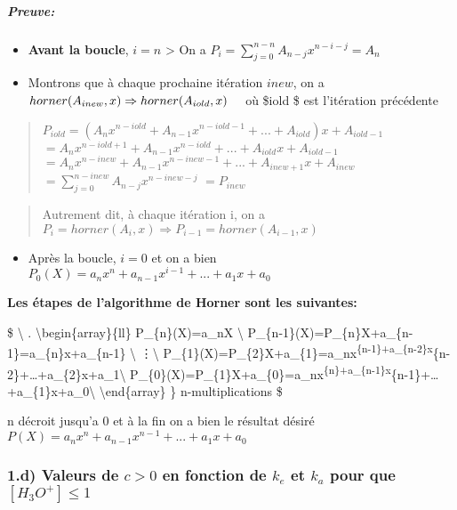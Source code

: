 \documentclass[11pt]{article}
\providecommand{\tightlist}{%
      \setlength{\itemsep}{0pt}\setlength{\parskip}{0pt}}
\begin{document}
\hypertarget{preuve}{%
\subparagraph{\texorpdfstring{\textbf{Preuve}:}{Preuve:}}\label{preuve}}

\begin{itemize}
\tightlist
\item
  \textbf{Avant la boucle}, \(i = n\) \textgreater{} On a
  \(P_i = \sum_{j=0}^{n-n}A_{n-j}x^{n-i-j}=A_n\)
\item
  Montrons que à chaque prochaine itération \(inew\), on a
  \(horner(A_{inew},x)\Rightarrow horner(A_{iold},x)\hspace{10px}\) où
  \$\hspace{10px}iold \$ est l'itération précédente
\end{itemize}

\begin{quote}
\(P_{iold}= (A_nx^{n-iold}+A_{n-1}x^{n-iold-1}+...+A_{iold})x+A_{iold-1}\)
\(= A_nx^{n-iold+1}+A_{n-1}x^{n-iold}+...+A_{iold}x+A_{iold-1}\)
\(= A_nx^{n-inew}+A_{n-1}x^{n-inew-1}+...+A_{inew+1}x+A_{inew}\)
\(=\sum_{j=0}^{n-inew}A_{n-j}x^{n-inew-j}\) \(=P_{inew}\)
\end{quote}

\begin{quote}
Autrement dit, à chaque itération i, on a
\(P_i = horner(A_i,x) \Rightarrow P_{i-1} = horner(A_{i-1},x)\)
\end{quote}

\begin{itemize}
\tightlist
\item
  Après la boucle, \(i=0\) et on a bien
  \(P_{0}(X)=a_nx^{n}+a_{n-1}x^{i-1}+...+a_{1}x+a_0\)
\end{itemize}

    \textbf{Les étapes de l'algorithme de Horner sont les suivantes:}

\$ \textbackslash{} \left. \textbackslash{}begin\{array\}\{ll\}
P\_\{n\}(X)=a\_nX \textbackslash{}
P\_\{n-1\}(X)=P\_\{n\}X+a\_\{n-1\}=a\_\{n\}x+a\_\{n-1\} \textbackslash{}
\vdots \textbackslash{}
P\_\{1\}(X)=P\_\{2\}X+a\_\{1\}=a\_nx\textsuperscript{\{n-1\}+a\_\{n-2\}x}\{n-2\}+\ldots{}+a\_\{2\}x+a\_1\textbackslash{}
P\_\{0\}(X)=P\_\{1\}X+a\_\{0\}=a\_nx\textsuperscript{\{n\}+a\_\{n-1\}x}\{n-1\}+\ldots{}+a\_\{1\}x+a\_0\textbackslash{}
\textbackslash{}end\{array\} \right \} n-multiplications \$

n décroit jusqu'a 0 et à la fin on a bien le résultat désiré
\(P(X)= a_nx^{n}+a_{n-1}x^{n-1}+...+a_{1}x+a_0\) 

    \hypertarget{d-valeurs-de-c0-en-fonction-de-k_e-et-k_a-pour-que-h_3oleqslant-1}{%
\subsubsection{\texorpdfstring{\textbf{1.d) Valeurs de \(c>0\) en
fonction de \(k_e\) et \(k_a\) pour que
\([H_3O^+]\leqslant 1\)}}{1.d) Valeurs de c\textgreater{}0 en fonction de k\_e et k\_a pour que {[}H\_3O\^{}+{]}\textbackslash{}leqslant 1}}\label{d-valeurs-de-c0-en-fonction-de-k_e-et-k_a-pour-que-h_3oleqslant-1}}
\end{document}
